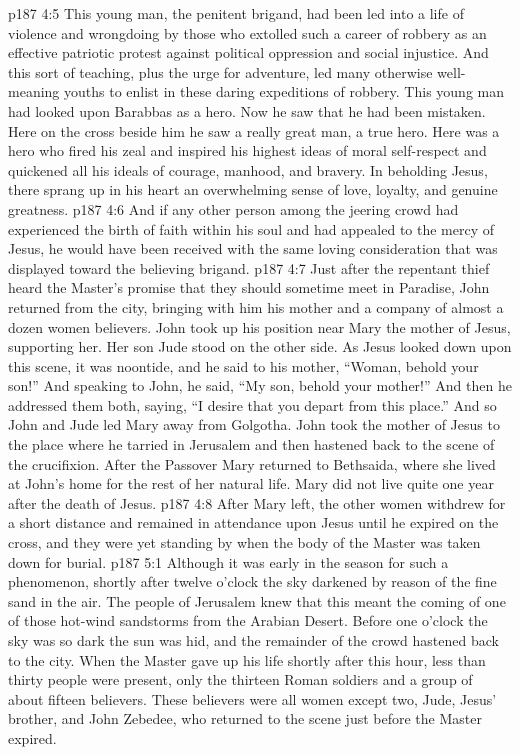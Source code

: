 \pc \vs p187 4:5 This young man, the penitent brigand, had been led into a life of violence and wrongdoing by those who extolled such a career of robbery as an effective patriotic protest against political oppression and social injustice. And this sort of teaching, plus the urge for adventure, led many otherwise well\hyp{}meaning youths to enlist in these daring expeditions of robbery. This young man had looked upon Barabbas as a hero. Now he saw that he had been mistaken. Here on the cross beside him he saw a really great man, a true hero. Here was a hero who fired his zeal and inspired his highest ideas of moral self\hyp{}respect and quickened all his ideals of courage, manhood, and bravery. In beholding Jesus, there sprang up in his heart an overwhelming sense of love, loyalty, and genuine greatness.
\vs p187 4:6 And if any other person among the jeering crowd had experienced the birth of faith within his soul and had appealed to the mercy of Jesus, he would have been received with the same loving consideration that was displayed toward the believing brigand.
\pc \vs p187 4:7 Just after the repentant thief heard the Master’s promise that they should sometime meet in Paradise, John returned from the city, bringing with him his mother and a company of almost a dozen women believers. John took up his position near Mary the mother of Jesus, supporting her. Her son Jude stood on the other side. As Jesus looked down upon this scene, it was noontide, and he said to his mother, \textcolor{ubdarkred}{“Woman, behold your son!”} And speaking to John, he said, \textcolor{ubdarkred}{“My son, behold your mother!”} And then he addressed them both, saying, \textcolor{ubdarkred}{“I desire that you depart from this place.”} And so John and Jude led Mary away from Golgotha. John took the mother of Jesus to the place where he tarried in Jerusalem and then hastened back to the scene of the crucifixion. After the Passover Mary returned to Bethsaida, where she lived at John’s home for the rest of her natural life. Mary did not live quite one year after the death of Jesus.
\vs p187 4:8 After Mary left, the other women withdrew for a short distance and remained in attendance upon Jesus until he expired on the cross, and they were yet standing by when the body of the Master was taken down for burial.\plusone
{}
\vs p187 5:1 Although it was early in the season for such a phenomenon, shortly after twelve o’clock the sky darkened by reason of the fine sand in the air. The people of Jerusalem knew that this meant the coming of one of those hot\hyp{}wind sandstorms from the Arabian Desert. Before one o’clock the sky was so dark the sun was hid, and the remainder of the crowd hastened back to the city. When the Master gave up his life shortly after this hour, less than thirty people were present, only the thirteen Roman soldiers and a group of about fifteen believers. These believers were all women except two, Jude, Jesus’ brother, and John Zebedee, who returned to the scene just before the Master expired.
